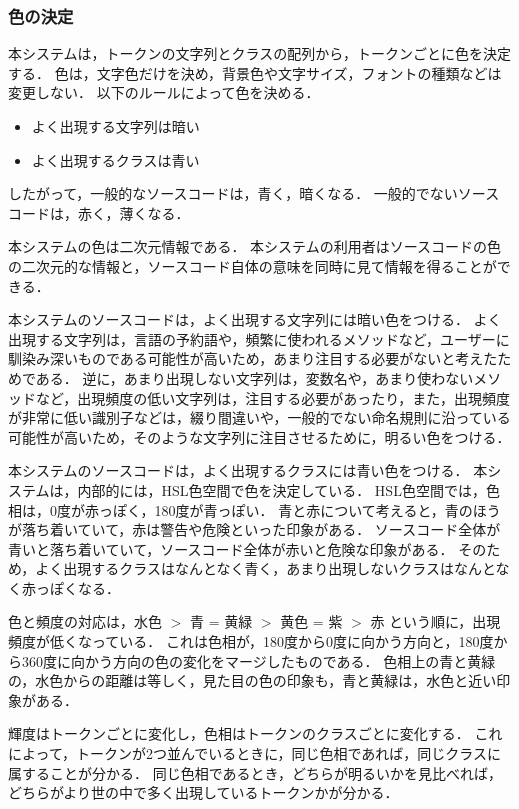 \documentclass{cs-thesis}
\begin{document}
  \subsubsection{色の決定}
  本システムは，トークンの文字列とクラスの配列から，トークンごとに色を決定する．
  色は，文字色だけを決め，背景色や文字サイズ，フォントの種類などは変更しない．
  以下のルールによって色を決める．
  \begin{itemize}
   \item よく出現する文字列は暗い
   \item よく出現するクラスは青い
  \end{itemize}
  したがって，一般的なソースコードは，青く，暗くなる．
  一般的でないソースコードは，赤く，薄くなる．

  本システムの色は二次元情報である．
  本システムの利用者はソースコードの色の二次元的な情報と，ソースコード自体の意味を同時に見て情報を得ることができる．

  本システムのソースコードは，よく出現する文字列には暗い色をつける．
  よく出現する文字列は，言語の予約語や，頻繁に使われるメソッドなど，ユーザーに馴染み深いものである可能性が高いため，あまり注目する必要がないと考えたためである．
  逆に，あまり出現しない文字列は，変数名や，あまり使わないメソッドなど，出現頻度の低い文字列は，注目する必要があったり，また，出現頻度が非常に低い識別子などは，綴り間違いや，一般的でない命名規則に沿っている可能性が高いため，そのような文字列に注目させるために，明るい色をつける．

  本システムのソースコードは，よく出現するクラスには青い色をつける．
  本システムは，内部的には，HSL色空間で色を決定している．
  HSL色空間では，色相は，0度が赤っぽく，180度が青っぽい．
  青と赤について考えると，青のほうが落ち着いていて，赤は警告や危険といった印象がある．
  ソースコード全体が青いと落ち着いていて，ソースコード全体が赤いと危険な印象がある．
  そのため，よく出現するクラスはなんとなく青く，あまり出現しないクラスはなんとなく赤っぽくなる．

  色と頻度の対応は，水色 $>$ 青 = 黄緑 $>$ 黄色 = 紫 $>$ 赤 という順に，出現頻度が低くなっている．
  これは色相が，180度から0度に向かう方向と，180度から360度に向かう方向の色の変化をマージしたものである．
  色相上の青と黄緑の，水色からの距離は等しく，見た目の色の印象も，青と黄緑は，水色と近い印象がある．

  輝度はトークンごとに変化し，色相はトークンのクラスごとに変化する．
  これによって，トークンが2つ並んでいるときに，同じ色相であれば，同じクラスに属することが分かる．
  同じ色相であるとき，どちらが明るいかを見比べれば，どちらがより世の中で多く出現しているトークンかが分かる．
\end{document}

